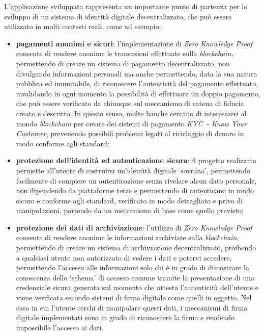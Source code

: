 L'applicazione sviluppata rappresenta un importante punto di partenza per lo sviluppo di un sistema di identità digitale decentralizzato, che può essere utilizzato in molti contesti reali, come ad esempio:
\begin{itemize}
    \item \textbf{pagamenti anonimi e sicuri}: l'implementazione di \textit{Zero Knowledge Proof} consente di rendere anonime le transazioni effettuate sulla \textit{blockchain}, permettendo di creare un sistema di pagamento decentralizzato, non divulgando informazioni personali ma anche 
    permettendo, data la sua natura pubblica ed immutabile, di riconoscere l'autenticità del pagamento effettuato, invalidando in ogni momento la possibilità di effettuare un doppio pagamento, che può essere verificato da chiunque sul meccanismo di catena di fiducia creato e descritto.
    In questo senso, molte banche cercano di interessarsi al mondo \textit{blockchain} per creare dei sistemi di pagamento \textit{KYC~- Know Your Customer}, prevenendo possibili problemi legati al riciclaggio di denaro in modo conforme agli standard;
    \item \textbf{protezione dell'identità ed autenticazione sicura}: il progetto realizzato permette all'utente di costruirsi un'identità digitale `sovrana', permettendo facilmente di compiere un autenticazione senza rivelare alcun dato personale, non dipendendo da piattaforme terze 
    e permettendo di autenticarsi in modo sicuro e conforme agli standard, verificato in modo dettagliato e privo di manipolazioni, partendo da un meccanismo di base come quello previsto;
    \item \textbf{protezione dei dati di archiviazione}: l'utilizzo di \textit{Zero Knowledge Proof} consente di rendere anonime le informazioni archiviate sulla \textit{blockchain}, permettendo di creare un sistema di archiviazione decentralizzato, proibendo a qualsiasi utente 
    non autorizzato di vedere i dati e potervi accedere, permettendo l'accesso alle informazioni solo chi è in grado di dimostrare la conoscenza dello `schema' di accesso comune tramite la presentazione di una credenziale sicura generata sul momento che attesta l'autenticità dell'utente
    e viene verificata secondo sistemi di firma digitale come quelli in oggetto. Nel caso in cui l'utente cerchi di manipolare questi dati, i meccanismi di firma digitale implementati sono in grado di riconoscere la firma e rendendo impossibile l'accesso ai dati.
\end{itemize}

